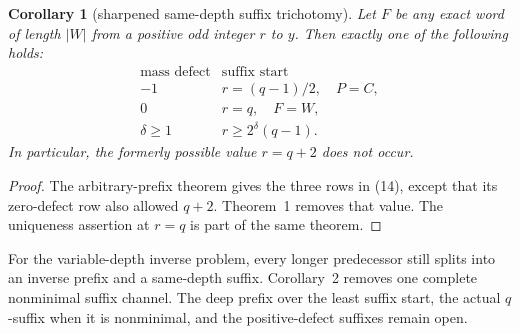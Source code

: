 \documentclass[11pt]{article}
\newtheorem{corollary}[theorem]{Corollary}
\begin{document}
\begin{corollary}[sharpened same-depth suffix trichotomy]
Let \(F\) be any exact word of length \(|W|\) from a positive odd
integer \(r\) to \(y\).  Then exactly one of the following holds:
\[
\begin{array}{c|c}
\text{mass defect}&\text{suffix start}\\ \hline
-1&r=(q-1)/2,\quad P=C,\\
0&r=q,\quad F=W,\\
\delta\geq1&r\geq2^\delta(q-1).
\end{array}
\tag{14}
\]
In particular, the formerly possible value \(r=q+2\) does not occur.
\end{corollary}

\begin{proof}
The arbitrary-prefix theorem gives the three rows in (14), except that
its zero-defect row also allowed \(q+2\).  Theorem~1 removes that value.
The uniqueness assertion at \(r=q\) is part of the same theorem.
\end{proof}

For the variable-depth inverse problem, every longer predecessor still
splits into an inverse prefix and a same-depth suffix.  Corollary~2
removes one complete nonminimal suffix channel.  The deep prefix over
the least suffix start, the actual \(q\)-suffix when it is nonminimal,
and the positive-defect suffixes remain open.
\end{document}
